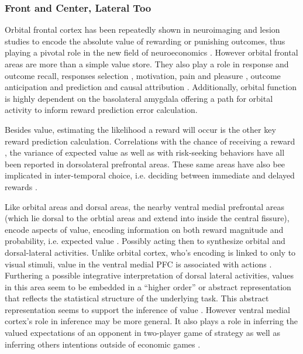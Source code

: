\documentclass[doc,12pt]{apa}        %
\begin{document}
\subsubsection{Front and Center, Lateral Too}
\label{subsub:fclt}
Orbital frontal cortex has been repeatedly shown in neuroimaging \cite{ODoherty:2001p2423} and lesion \cite{Hornak:2004p6234} studies to encode the absolute value of rewarding or punishing outcomes, thus playing a pivotal role in the new field of neuroeconomics \cite{Glimcher:2005p863}.  However orbital frontal areas are more than a simple value store.  They also play a role in response and outcome recall, responses selection \cite{Rudebeck:2008p4712, Furuyashiki:2008p1631}, motivation, pain and pleasure \cite{Atlas:2010p7566}, outcome anticipation and prediction \cite{Tanaka:2006fk, Roesch:2007p7182} and causal attribution \cite{Tanaka:2008p3265}.  Additionally, orbital function is highly dependent on the basolateral amygdala \cite{ODoherty:2003p2616} offering a path for orbital activity to inform reward prediction error calculation.  

Besides value, estimating the likelihood a reward will occur is the other key reward prediction calculation.  Correlations with the chance of receiving a reward \cite{Tobler:2009p8297}, the variance of expected value \cite{Kahnt:2010p7677} as well as with risk-seeking behaviors \cite{Tobler:2007p1562} have all been reported in dorsolateral prefrontal areas.  These same areas have also bee implicated in inter-temporal choice, i.e. deciding between immediate and delayed rewards \cite{Kim:2009p8304,Kim:2008p2984}.  

Like orbital areas and dorsal areas, the nearby ventral medial prefrontal areas (which lie dorsal to the orbtial areas and extend into inside the central fissure), encode aspects of value, encoding information on both reward magnitude and probability, i.e. expected value \cite{Knutson:2005p1627}.  Possibly acting then to synthesize orbital and dorsal-lateral activities.  Unlike orbital cortex, who's encoding is linked to only to visual stimuli, value in the ventral medial PFC is associated with actions \cite{Glascher:2009p9352}.   Furthering a possible integrative interpretation of dorsal lateral activities, values in this area seem to be embedded in a ``higher order''  or abstract representation that reflects the statistical structure of the underlying task.  This abstract representation seems to support the inference of value \cite{Hampton:2006p2577}.  However ventral medial cortex's role in inference may be more general. It also plays a role in inferring the valued expectations of an opponent in two-player game of strategy \cite{Hampton:2008p6345} as well as inferring others intentions outside of economic games \cite{Cooper:2010p9353}.
\end{document}

